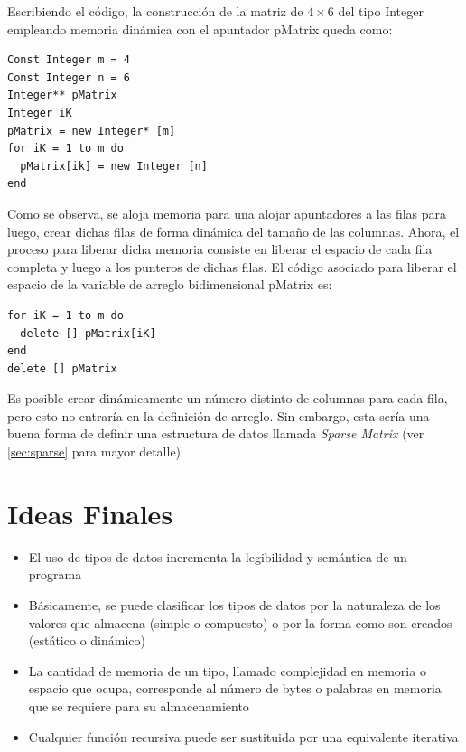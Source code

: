 Escribiendo el código, la construcción de la matriz de $4 \times 6$ del tipo Integer empleando memoria dinámica con el apuntador pMatrix queda como:

\begin{lstlisting}[upquote=true, language=pseudo]
Const Integer m = 4
Const Integer n = 6
Integer** pMatrix
Integer iK
pMatrix = new Integer* [m]
for iK = 1 to m do
  pMatrix[ik] = new Integer [n]
end
\end{lstlisting}

Como se observa, se aloja memoria para una alojar apuntadores a las filas para luego,  crear dichas filas de forma dinámica del tamaño de las columnas. Ahora, el proceso para liberar dicha memoria consiste en liberar el espacio de cada fila completa y luego a los punteros de dichas filas. El código asociado para liberar el espacio de la variable de arreglo bidimensional pMatrix es:

\begin{lstlisting}[upquote=true, language=pseudo]
for iK = 1 to m do
  delete [] pMatrix[iK]
end
delete [] pMatrix
\end{lstlisting}

Es posible crear dinámicamente un número distinto de columnas para cada fila, pero esto no entraría en la definición de arreglo. Sin embargo, esta sería una buena forma de definir una estructura de datos llamada \textit{Sparse Matrix} (ver \ref{sec:sparse} para mayor detalle)

\section{Ideas Finales}

\begin{itemize}
\item El uso de tipos de datos incrementa la legibilidad y semántica de un programa
\item Básicamente, se puede clasificar los tipos de datos por la naturaleza de los valores que almacena (simple o compuesto) o por la forma como son creados (estático o dinámico)
\item La cantidad de memoria de un tipo, llamado complejidad en memoria o espacio que ocupa, corresponde al número de bytes o palabras en memoria que se requiere para su almacenamiento
\item Cualquier función recursiva puede ser sustituida por una equivalente iterativa
\end{itemize}


